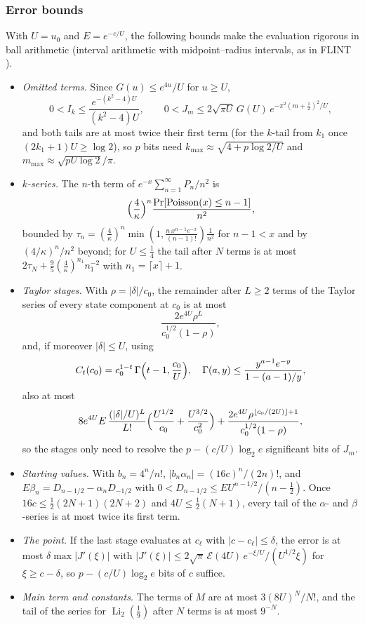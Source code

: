 \documentclass[11pt,reqno]{amsart}
\theoremstyle{definition}
\theoremstyle{remark}
\newcommand{\Eip}{\mathcal{E}}
\newcommand{\Li}{\operatorname{Li}}
\begin{document}
\subsubsection{Error bounds}\label{sec:khbounds}
With $U = u_0$ and $E = e^{-c/U}$, the following bounds make the evaluation rigorous in ball arithmetic (interval arithmetic with midpoint--radius
intervals, as in FLINT \cite{FLINT,Joh17}).
\begin{itemize}
\item \emph{Omitted terms.} Since $G(u) \le e^{4u}/U$ for $u \ge U$,
\[
  0 < I_k \le \frac{e^{-(k^2-4)U}}{(k^2-4)U}, \qquad 0 < J_m \le 2\sqrt{\pi U}\,G(U)\,e^{-\pi^2(m+\frac12)^2/U},
\]
and both tails are at most twice their first term (for the $k$-tail from $k_1$ once $(2k_1+1)U \ge \log 2$), so $p$ bits need $k_{\max} \approx \sqrt{4 + p\log2/U}$ and
$m_{\max} \approx \sqrt{pU\log 2}/\pi$.
\item \emph{$k$-series.} The $n$-th term of $e^{-x}\sum_{n=1}^{\infty}P_n/n^2$ is
\[
  \Bigl(\frac4\kappa\Bigr)^n\frac{\Pr[\mathrm{Poisson}(x) \le n-1]}{n^2},
\]
bounded by $\tau_n = (\frac4\kappa)^n\min(1, \frac{n\,x^{n-1}e^{-x}}{(n-1)!})\frac{1}{n^2}$ for $n - 1 < x$ and by
$(4/\kappa)^n/n^2$ beyond; for $U \le \frac14$ the tail after $N$ terms is at most
$2\tau_N + \frac95(\frac4\kappa)^{n_1}n_1^{-2}$ with $n_1 = \lceil x\rceil + 1$.
\item \emph{Taylor stages.} With $\rho = |\delta|/c_0$, the remainder after $L \ge 2$ terms of the Taylor series of
every state component at $c_0$ is at most
\[
  \frac{2e^{4U}\rho^L}{c_0^{1/2}(1-\rho)},
\]
and, if moreover $|\delta| \le U$, using
\[
  C_t(c_0) = c_0^{1-t}\,\Gamma\Bigl(t-1, \frac{c_0}U\Bigr), \quad \Gamma(a, y) \le \frac{y^{a-1}e^{-y}}{1 - (a-1)/y},
\]
also at most
\[
  8e^{4U}E\,\frac{(|\delta|/U)^L}{L!}\Bigl(\frac{U^{1/2}}{c_0} + \frac{U^{3/2}}{c_0^2}\Bigr)
  + \frac{2e^{4U}\rho^{\lfloor c_0/(2U)\rfloor+1}}{c_0^{1/2}(1-\rho)},
\]
so the stages only need to resolve the $p - (c/U)\log_2 e$ significant bits of $J_m$.
\item \emph{Starting values.} With $b_n = 4^n/n!$, $|b_n\alpha_n| = (16c)^n/(2n)!$, and
$E\beta_n = D_{n-1/2} - \alpha_nD_{-1/2}$ with $0 < D_{n-1/2} \le EU^{n-1/2}/(n-\frac12)$. Once
$16c \le \frac12(2N+1)(2N+2)$ and $4U \le \frac12(N+1)$, every tail of the $\alpha$- and $\beta$-series is at most
twice its first term.
\item \emph{The point.} If the last stage evaluates at $c_\ell$ with $|c - c_\ell| \le \delta$, the error is at most
$\delta\max|J'(\xi)|$ with
$|J'(\xi)| \le 2\sqrt\pi\,\Eip(4U)\,e^{-\xi/U}/(U^{1/2}\xi)$ for $\xi \ge c - \delta$, so
$p - (c/U)\log_2e$ bits of $c$ suffice.
\item \emph{Main term and constants.} The terms of $M$ are at most $3(8U)^N/N!$, and the tail of the series for
$\Li_2(\frac19)$ after $N$ terms is at most $9^{-N}$.
\end{itemize}
\end{document}
